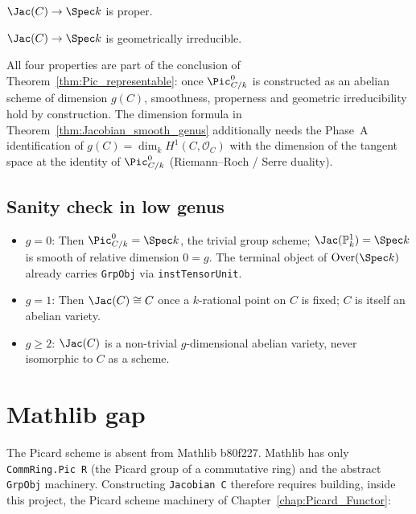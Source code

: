 \begin{theorem}[Properness]
  \label{thm:Jacobian_proper}
  \leanok
  $\Jac(C) \to \Spec k$ is proper.
\end{theorem}

\begin{theorem}
  \label{thm:Jacobian_geomIrred}
  \leanok
  $\Jac(C) \to \Spec k$ is geometrically irreducible.
\end{theorem}

\noindent All four properties are part of the conclusion of Theorem~\ref{thm:Pic_representable}: once $\Pic^0_{C/k}$ is constructed as an abelian scheme of dimension $g(C)$, smoothness, properness and geometric irreducibility hold by construction. The dimension formula in Theorem~\ref{thm:Jacobian_smooth_genus} additionally needs the Phase~A identification of $g(C) = \dim_k H^1(C, \mathcal O_C)$ with the dimension of the tangent space at the identity of $\Pic^0_{C/k}$ (Riemann--Roch / Serre duality).

\subsection{Sanity check in low genus}

\begin{itemize}
  \item $g = 0$: Then $\Pic^0_{C/k} = \Spec k$, the trivial group scheme; $\Jac(\mathbb P^1_k) = \Spec k$ is smooth of relative dimension $0 = g$. The terminal object of $\textrm{Over}(\Spec k)$ already carries \lstinline{GrpObj} via \lstinline{instTensorUnit}.
  \item $g = 1$: Then $\Jac(C) \cong C$ once a $k$-rational point on $C$ is fixed; $C$ is itself an abelian variety.
  \item $g \ge 2$: $\Jac(C)$ is a non-trivial $g$-dimensional abelian variety, never isomorphic to $C$ as a scheme.
\end{itemize}

\section{Mathlib gap}

The Picard scheme is absent from Mathlib b80f227. Mathlib has only \lstinline{CommRing.Pic R} (the Picard group of a commutative ring) and the abstract \lstinline{GrpObj} machinery. Constructing \lstinline{Jacobian C} therefore requires building, inside this project, the Picard scheme machinery of Chapter~\ref{chap:Picard_Functor}:

